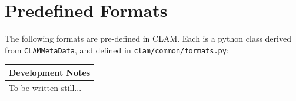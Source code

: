 \documentclass[a4paper,12pt]{report}
\newenvironment{devnotes}
{\newpage
\begin{center}
    \begin{tabular}[h!]{|p{0.8\textwidth}|}
    \hline
    {\bf Development Notes}\\\hline}
{   \\\hline
    \end{tabular}
\end{center}}
\begin{document}
\chapter{Predefined Formats}

The following formats are pre-defined in CLAM. Each is a python class derived from \texttt{CLAMMetaData}, and defined in \texttt{clam/common/formats.py}:

\begin{devnotes}
To be written still...
\end{devnotes}



\end{document}
